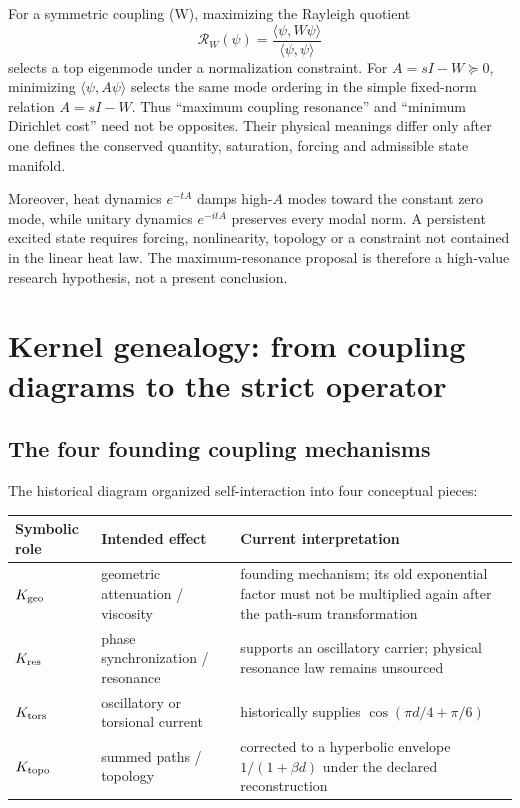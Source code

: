 \documentclass[11pt,a4paper]{article}
\theoremstyle{definition}
\theoremstyle{remark}
\begin{document}
For a symmetric coupling (W), maximizing the Rayleigh quotient
\[
\mathcal R_W(\psi)=\frac{\langle\psi,W\psi\rangle}{\langle\psi,\psi\rangle}
\]
selects a top eigenmode under a normalization constraint. For $A=sI-W\succeq0$, minimizing $\langle\psi,A\psi\rangle$ selects the same mode ordering in the simple fixed-norm relation $A=sI-W$. Thus ``maximum coupling resonance'' and ``minimum Dirichlet cost'' need not be opposites. Their physical meanings differ only after one defines the conserved quantity, saturation, forcing and admissible state manifold.

Moreover, heat dynamics $e^{-tA}$ damps high-$A$ modes toward the constant zero mode, while unitary dynamics $e^{-itA}$ preserves every modal norm. A persistent excited state requires forcing, nonlinearity, topology or a constraint not contained in the linear heat law. The maximum-resonance proposal is therefore a high-value research hypothesis, not a present conclusion.

\section{Kernel genealogy: from coupling diagrams to the strict operator}

\subsection{The four founding coupling mechanisms}

The historical diagram organized self-interaction into four conceptual pieces:

\begin{center}
\begin{tabularx}{0.92\textwidth}{@{}p{}p{}X@{}}
\toprule
Symbolic role & Intended effect & Current interpretation\\
\midrule
$K_{\rm geo}$ & geometric attenuation / viscosity & founding mechanism; its old exponential factor must not be multiplied again after the path-sum transformation\\
$K_{\rm res}$ & phase synchronization / resonance & supports an oscillatory carrier; physical resonance law remains unsourced\\
$K_{\rm tors}$ & oscillatory or torsional current & historically supplies $\cos(\pi d/4+\pi/6)$\\
$K_{\rm topo}$ & summed paths / topology & corrected to a hyperbolic envelope $1/(1+\beta d)$ under the declared reconstruction\\
\bottomrule
\end{tabularx}
\end{center}
\end{document}
